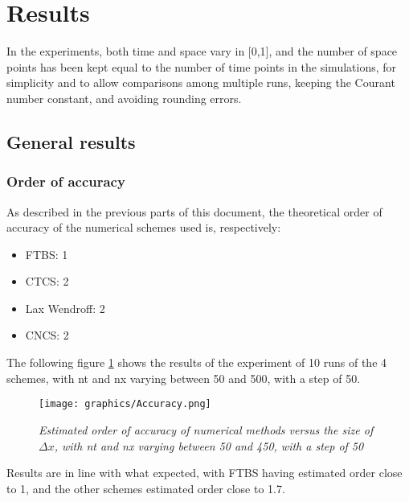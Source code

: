 

\section{Results}
In the experiments, both time and space vary in [0,1], and the number of space points has been kept equal to the number of time points in the simulations, for simplicity and to allow comparisons among multiple runs, keeping the Courant number constant, and avoiding rounding errors.

\subsection{General results}

\subsubsection{Order of accuracy}
As described in the previous parts of this document, the theoretical order of accuracy of the numerical schemes used is, respectively:
\begin{itemize}
	\item FTBS: 1
	\item CTCS: 2
	\item Lax Wendroff: 2
	\item CNCS: 2
\end{itemize}
The following figure \ref{fig:orderofacc} shows the results of the experiment of 10 runs of the 4 schemes, with nt and nx varying between 50 and 500, with a step of 50.
\begin{figure}[H]
	\begin{center}
		\texttt{[image: graphics/Accuracy.png]}
	\end{center}%
	\caption[Order of accuracy of numerical methods]{ \em Estimated order of accuracy of numerical methods versus the size of $\Delta x$, with nt and nx varying between 50 and 450, with a step of 50}
	\label{fig:orderofacc}
\end{figure}
Results are in line with what expected, with FTBS having estimated order close to 1, and the other schemes estimated order close to 1.7.

